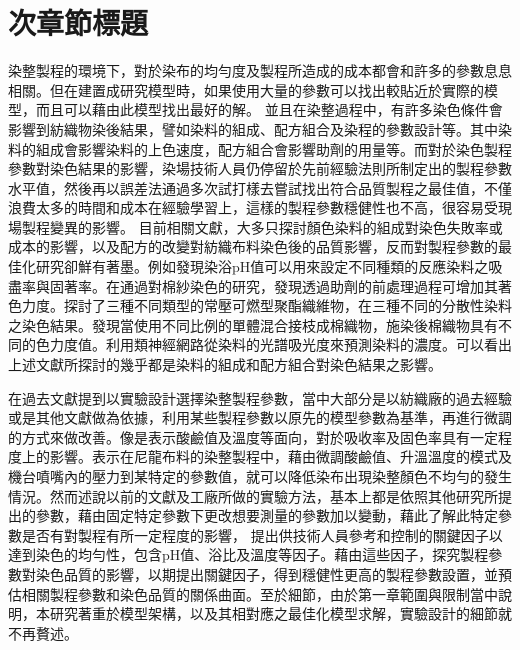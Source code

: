 \section{次章節標題}
\label{c:ch2.1}
染整製程的環境下，對於染布的均勻度及製程所造成的成本都會和許多的參數息息相關。但在建置成研究模型時，如果使用大量的參數可以找出較貼近於實際的模型，而且可以藉由此模型找出最好的解。
並且在染整過程中，有許多染色條件會影響到紡織物染後結果，譬如染料的組成、配方組合及染程的參數設計等。其中染料的組成會影響染料的上色速度，配方組合會影響助劑的用量等。而對於染色製程參數對染色結果的影響，染場技術人員仍停留於先前經驗法則所制定出的製程參數水平值，然後再以誤差法通過多次試打樣去嘗試找出符合品質製程之最佳值，不僅浪費太多的時間和成本在經驗學習上，這樣的製程參數穩健性也不高，很容易受現場製程變異的影響。
目前相關文獻，大多只探討顏色染料的組成對染色失敗率或成本的影響，以及配方的改變對紡織布料染色後的品質影響，反而對製程參數的最佳化研究卻鮮有著墨。例如\cite{Harada.etc}發現染浴pH值可以用來設定不同種類的反應染料之吸盡率與固著率。\cite{Guo.etc}在通過對棉紗染色的研究，發現透過助劑的前處理過程可增加其著色力度。\cite{Chen}探討了三種不同類型的常壓可燃型聚酯織維物，在三種不同的分散性染料之染色結果。\cite{Huang.etc}發現當使用不同比例的單體混合接枝成棉織物，施染後棉織物具有不同的色力度值。利用類神經網路從染料的光譜吸光度來預測染料的濃度。可以看出上述文獻所探討的幾乎都是染料的組成和配方組合對染色結果之影響。

在過去文獻提到以實驗設計選擇染整製程參數，當中大部分是以紡織廠的過去經驗或是其他文獻做為依據，利用某些製程參數以原先的模型參數為基準，再進行微調的方式來做改善。像是\cite{Harada.etc}表示酸鹼值及溫度等面向，對於吸收率及固色率具有一定程度上的影響。\cite{jy2007dyeing}表示在尼龍布料的染整製程中，藉由微調酸鹼值、升溫溫度的模式及機台噴嘴內的壓力到某特定的參數值，就可以降低染布出現染整顏色不均勻的發生情況。然而\cite{Etemadifar.etc}述說以前的文獻及工廠所做的實驗方法，基本上都是依照其他研究所提出的參數，藉由固定特定參數下更改想要測量的參數加以變動，藉此了解此特定參數是否有對製程有所一定程度的影響，
\cite{Wang.etc}提出供技術人員參考和控制的關鍵因子以達到染色的均勻性，包含pH值、浴比及溫度等因子。藉由這些因子，探究製程參數對染色品質的影響，以期提出關鍵因子，得到穩健性更高的製程參數設置，並預估相關製程參數和染色品質的關係曲面。至於細節，由於第一章範圍與限制當中說明，本研究著重於模型架構，以及其相對應之最佳化模型求解，實驗設計的細節就不再贅述。